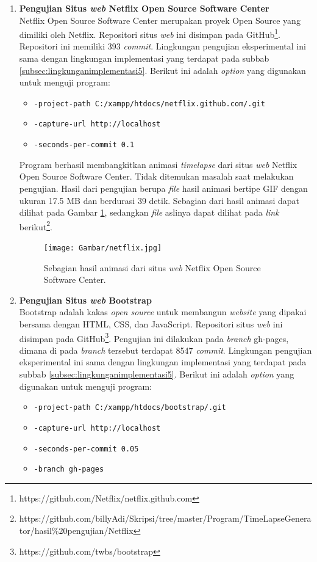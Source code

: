 \begin{enumerate}
\item \textbf{Pengujian Situs \textit{web} Netflix Open Source Software Center}\\
Netflix Open Source Software Center merupakan proyek Open Source yang dimiliki oleh Netflix. Repositori situs \textit{web} ini disimpan pada GitHub\footnote{https://github.com/Netflix/netflix.github.com}. Repositori ini memiliki 393 \textit{commit}. Lingkungan pengujian eksperimental ini sama dengan lingkungan implementasi yang terdapat pada subbab \ref{subsec:lingkunganimplementasi5}. Berikut ini adalah \textit{option} yang digunakan untuk menguji program:
\begin{itemize}
\item \texttt{-project-path C:/xampp/htdocs/netflix.github.com/.git}
\item \texttt{-capture-url http://localhost}
\item \texttt{-seconds-per-commit 0.1} 
\end{itemize}
Program berhasil membangkitkan animasi \textit{timelapse} dari situs \textit{web} Netflix Open Source Software Center. Tidak ditemukan masalah saat melakukan pengujian. Hasil dari pengujian berupa \textit{file} hasil animasi bertipe GIF dengan ukuran 17.5 MB dan berdurasi 39 detik. Sebagian dari hasil animasi dapat dilihat pada Gambar \ref{fig:hasil_netflix}, sedangkan \textit{file} aslinya dapat dilihat pada \textit{link} berikut\footnote{https://github.com/billyAdi/Skripsi/tree/master/Program/TimeLapseGenerator/hasil\%20pengujian/Netflix}.




\begin{figure}[H]	
		\texttt{[image: Gambar/netflix.jpg]}
	\caption{Sebagian hasil animasi dari situs \textit{web} Netflix Open Source Software Center.}
	\label{fig:hasil_netflix}
\end{figure}



\item \textbf{Pengujian Situs \textit{web} Bootstrap}\\
Bootstrap adalah kakas \textit{open source} untuk membangun \textit{website} yang dipakai bersama dengan HTML, CSS, dan JavaScript. Repositori situs \textit{web} ini disimpan pada GitHub\footnote{https://github.com/twbs/bootstrap}. Pengujian ini dilakukan pada \textit{branch} gh-pages, dimana di pada \textit{branch} tersebut terdapat 8547 \textit{commit}. Lingkungan pengujian eksperimental ini sama dengan lingkungan implementasi yang terdapat pada subbab \ref{subsec:lingkunganimplementasi5}. 
Berikut ini adalah \textit{option} yang digunakan untuk menguji program:
\begin{itemize}
\item \texttt{-project-path C:/xampp/htdocs/bootstrap/.git}
\item \texttt{-capture-url http://localhost}
\item \texttt{-seconds-per-commit 0.05} 
\item \texttt{-branch gh-pages}
\end{itemize}


\end{enumerate}
